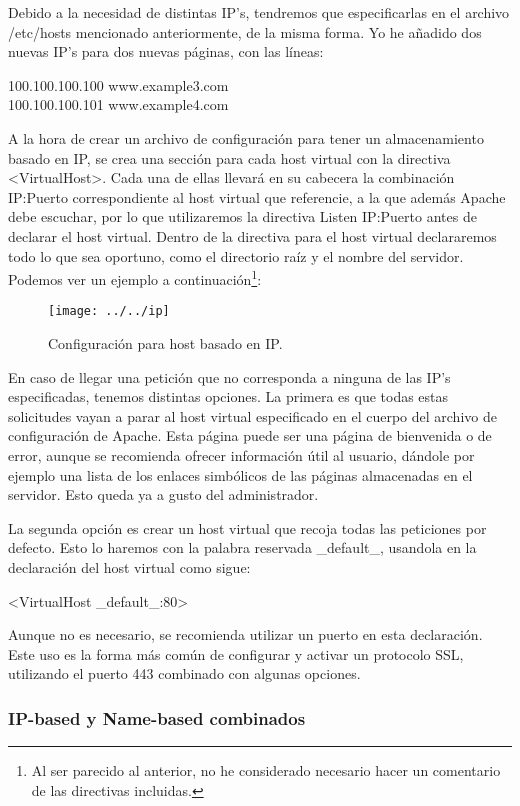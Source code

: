 \documentclass[a4paper, 10pt]{article} %
\begin{document}
Debido a la necesidad de distintas IP's, tendremos que especificarlas en el archivo /etc/hosts mencionado anteriormente, de la misma forma. Yo he añadido dos nuevas IP's para dos nuevas páginas, con las líneas:

100.100.100.100 www.example3.com \\
100.100.100.101 www.example4.com

A la hora de crear un archivo de configuración para tener un almacenamiento basado en IP, se crea una sección para cada host virtual con la directiva <VirtualHost>. Cada una de ellas llevará en su cabecera la combinación IP:Puerto correspondiente al host virtual que referencie, a la que además Apache debe escuchar, por lo que utilizaremos la directiva Listen IP:Puerto antes de declarar el host virtual. Dentro de la directiva para el host virtual declararemos todo lo que sea oportuno, como el directorio raíz y el nombre del servidor. Podemos ver un ejemplo a continuación\footnote{Al ser parecido al anterior, no he considerado necesario hacer un comentario de las directivas incluidas.}: 


\begin{figure}[htpb]
\centering
\texttt{[image: ../../ip]}
\caption{Configuración para host basado en IP.}
\end{figure}

En caso de llegar una petición que no corresponda a ninguna de las IP's especificadas, tenemos distintas opciones. La primera es que todas estas solicitudes vayan a parar al host virtual especificado en el cuerpo del archivo de configuración de Apache. Esta página puede ser una página de bienvenida o de error, aunque se recomienda ofrecer información útil al usuario, dándole por ejemplo una lista de los enlaces simbólicos de las páginas almacenadas en el servidor. Esto queda ya a gusto del administrador. 

La segunda opción es crear un host virtual que recoja todas las peticiones por defecto. Esto lo haremos con la palabra reservada \_default\_, usandola en la declaración del host virtual como sigue: 

<VirtualHost \_default\_:80> 

Aunque no es necesario, se recomienda utilizar un puerto en esta declaración. Este uso es la forma más común de configurar y activar un protocolo SSL, utilizando el puerto 443 combinado con algunas opciones.  

\subsubsection{IP-based y Name-based combinados}
\end{document}
